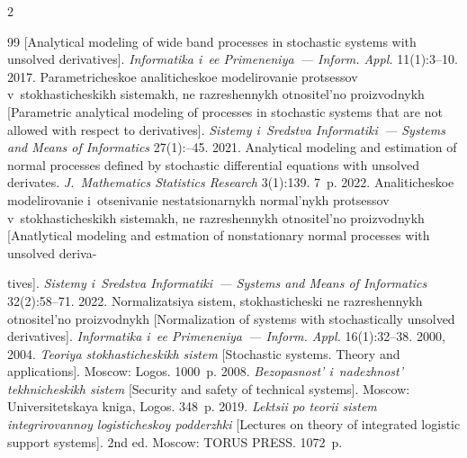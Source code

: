 \begin{multicols}{2}
{{\begin{thebibliography}{99}
[Analytical modeling of wide band processes in stochastic systems with unsolved derivatives].
 \textit{Informatika i~ee Primeneniya~--- Inform. Appl.} 11(1):3--10.
 2017. Pa\-ra\-met\-ri\-che\-skoe ana\-li\-ti\-che\-skoe mo\-de\-li\-ro\-va\-nie pro\-tses\-sov v~sto\-kha\-sti\-che\-skikh sis\-te\-makh, 
 ne raz\-re\-shen\-nykh ot\-no\-si\-tel'\-no pro\-iz\-vod\-nykh 
 [Parametric analytical modeling of processes in stochastic systems that are not allowed with respect to derivatives]. 
  \textit{Sistemy i~Sredstva Informatiki~--- Systems and Means of Informatics} 27(1):--45.
 2021. Analytical modeling and estimation of normal processes defined by stochastic differential equations with unsolved derivates.
 \textit{J.~Mathematics Statistics Research} 3(1):139. 7~p. 
 2022. Ana\-li\-ti\-che\-skoe mo\-de\-li\-ro\-va\-nie i~otse\-ni\-va\-nie ne\-sta\-tsi\-o\-nar\-nykh nor\-mal'\-nykh pro\-tses\-sov 
v~sto\-kha\-sti\-che\-skikh sis\-te\-makh, ne raz\-res\-hen\-nykh ot\-no\-si\-tel'\-no pro\-iz\-vod\-nykh [Anatlytical modeling and estmation of nonstationary normal processes with 
unsolved deriva-\linebreak\vspace*{-12pt}

\pagebreak

\noindent
tives].  \textit{Sistemy i~Sredstva Informatiki~--- Systems and Means of Informatics} 32(2):58--71.
 2022. Nor\-ma\-li\-za\-tsiya sis\-tem, sto\-kha\-sti\-che\-ski ne raz\-re\-shen\-nykh ot\-no\-si\-tel'\-no pro\-iz\-vod\-nykh 
 [Normalization of systems with stochastically unsolved derivatives]. 
  \textit{Informatika i~ee Primeneniya~--- Inform. Appl.} 16(1):32--38.
 2000, 2004.  \textit{Teo\-riya sto\-kha\-sti\-che\-skikh sis\-tem}
 [Stochastic systems. Theory and applications]. Moscow: Logos. 1000~p.
 2008.  \textit{Bezopas\-nost' i~na\-dezh\-nost' tekh\-ni\-che\-skikh sis\-tem} [Security and safety of technical systems]. Moscow: Universitetskaya kniga, Logos. 348~p.
 2019. \textit{Lek\-tsii po teo\-rii sis\-tem in\-teg\-ri\-ro\-van\-noy lo\-gi\-sti\-che\-skoy pod\-derzh\-ki}
  [Lectures on theory of integrated logistic support systems]. 2nd ed. Moscow: TORUS PRESS. 1072~p.
 \end{thebibliography}

 }
 }

\end{multicols}

